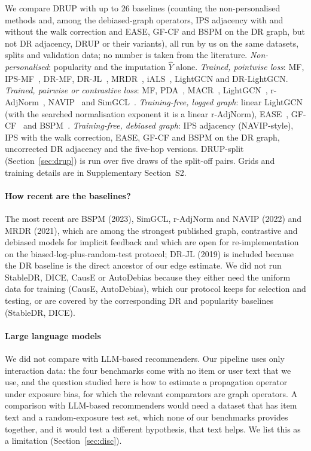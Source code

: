 \documentclass[preprint,review,12pt,authoryear]{elsarticle}
\theoremstyle{definition}
\begin{document}
We compare DRUP with up to 26 baselines (counting the non-personalised methods and, among the debiased-graph operators,
IPS adjacency with and without the walk correction and EASE, GF-CF and BSPM on the DR graph, but not DR adjacency,
DRUP or their variants), all run by us on the same datasets,
splits and validation data; no number is taken from the literature.
\emph{Non-personalised}: popularity and the imputation $\hat Y$ alone.
\emph{Trained, pointwise loss}: MF, IPS-MF~\citep{schnabel2016}, DR-MF,
DR-JL~\citep{wang2019drjl}, MRDR~\citep{guo2021mrdr}, iALS~\citep{hu2008ials},
LightGCN and DR-LightGCN. \emph{Trained, pairwise or contrastive loss}: MF, PDA~\citep{zhang2021pda},
MACR~\citep{wei2021macr}, LightGCN~\citep{he2020lightgcn},
r-AdjNorm~\citep{zhao2022radjnorm}, NAVIP~\citep{kim2022navip} and
SimGCL~\citep{yu2022simgcl}. \emph{Training-free, logged graph}: linear
LightGCN (with the searched normalisation exponent it is a linear r-AdjNorm),
EASE~\citep{steck2019ease}, GF-CF~\citep{shen2021gfcf} and
BSPM~\citep{choi2023bspm}. \emph{Training-free, debiased graph}: IPS adjacency
(NAVIP-style), IPS with the walk correction, EASE, GF-CF and BSPM on the DR graph,
uncorrected DR adjacency and the five-hop versions. DRUP-split
(Section~\ref{sec:drup}) is run over five draws of the split-off pairs. Grids and
training details are in Supplementary Section~S2.

\paragraph{How recent are the baselines?} The most recent are BSPM (2023),
SimGCL, r-AdjNorm and NAVIP (2022) and MRDR (2021), which are among the
strongest published graph, contrastive and debiased models for implicit
feedback and which are open for re-implementation on the biased-log-plus-random-test
protocol; DR-JL (2019) is included because the DR baseline is the direct
ancestor of our edge estimate. We did not run StableDR, DICE, CausE or AutoDebias
because they either need the uniform data for training (CausE, AutoDebias), which
our protocol keeps for selection and testing, or are covered by the
corresponding DR and popularity baselines (StableDR, DICE).

\paragraph{Large language models} We did not compare with LLM-based
recommenders. Our pipeline uses only interaction data: the four benchmarks come
with no item or user text that we use, and the question studied here is how to
estimate a propagation operator under exposure bias, for which the relevant
comparators are graph operators. A comparison with LLM-based recommenders would
need a dataset that has item text and a random-exposure test set, which none of our
benchmarks provides together, and it would test a different hypothesis, that text
helps. We list this as a limitation (Section~\ref{sec:disc}).
\end{document}
